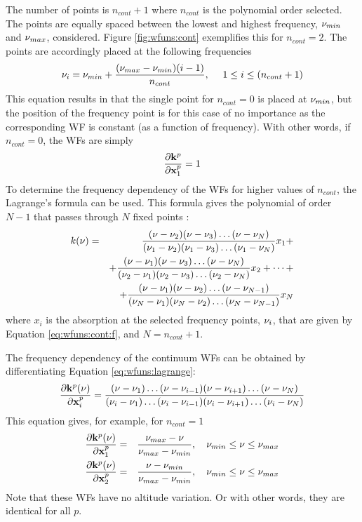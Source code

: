  
 The number of points is $n_{cont}+1$ where $n_{cont}$ is the
 polynomial order selected.  The points are equally spaced between the
 lowest and highest frequency, $\nu_{min}$ and $\nu_{max}$, considered.
 Figure \ref{fig:wfuns:cont} exemplifies this for $n_{cont}=2$.  The
 points are accordingly placed at the following frequencies
 \begin{equation}
   \nu_i = \nu_{min} + \frac{(\nu_{max}-\nu_{min})(i-1)}{n_{cont}}, \
          \quad 1 \leq i \leq (n_{cont}+1)
  \label{eq:wfuns:cont:f}
 \end{equation}
 This equation results in that the single point for $n_{cont}=0$ is
 placed at $\nu_{min}$, but the position of the frequency point is
 for this case of no importance as the corresponding WF is constant
 (as a function of frequency). With other words, 
 if $n_{cont}=0$, the WFs are simply 
 \begin{equation}
   \frac{\partial \mathbf{k}^p}{\partial \mathbf{x}^p_1} = 1
 \end{equation}
 To determine the frequency dependency of the WFs for higher values of
 $n_{cont}$, the Lagrange's formula can be used. This formula gives
 the polynomial of order $N-1$ that passes through $N$ fixed points
 \citep[][Eq. 3.1.1]{press:92}:
 \begin{eqnarray}
   k(\nu) &=& \frac{(\nu-\nu_2)(\nu-\nu_3)\dots(\nu-\nu_N)}
                  {(\nu_1-\nu_2)(\nu_1-\nu_3)\dots(\nu_1-\nu_N)}
           x_1 + \nonumber \\ 
       & & +\frac{(\nu-\nu_1)(\nu-\nu_3)\dots(\nu-\nu_N)}
                 {(\nu_2-\nu_1)(\nu_2-\nu_3)\dots(\nu_2-\nu_N)}
           x_2 + \cdots + \nonumber \\
       & & +\frac{(\nu-\nu_1)(\nu-\nu_2)\dots(\nu-\nu_{N-1})}
                 {(\nu_N-\nu_1)(\nu_N-\nu_2)\dots(\nu_N-\nu_{N-1})} x_N
  \label{eq:wfuns:lagrange}
 \end{eqnarray}
 where $x_i$ is the absorption at the selected frequency points, $\nu_i$,
 that are given by Equation \ref{eq:wfuns:cont:f}, and $N=n_{cont}+1$.
 
 The frequency dependency of the continuum WFs can be obtained by
 differentiating Equation \ref{eq:wfuns:lagrange}:
 \begin{equation}
   \frac{\partial \mathbf{k}^p(\nu)}{\partial \mathbf{x}^p_i} =
   \frac{(\nu-\nu_1)\dots(\nu-\nu_{i-1})(\nu-\nu_{i+1})\dots(\nu-\nu_N)}{(\nu_i-\nu_1)\dots(\nu_i-\nu_{i-1})(\nu_i-\nu_{i+1})\dots(\nu_i-\nu_N)}
 \end{equation}
 This equation gives, for example, for $n_{cont}=1$
 \begin{eqnarray}
   \frac{\partial \mathbf{k}^p(\nu)}{\partial \mathbf{x}^p_1} &=& \frac{\nu_{max}-\nu}
          {\nu_{max}-\nu_{min}}, \quad \nu_{min}\leq \nu \leq \nu_{max} \\
   \frac{\partial \mathbf{k}^p(\nu)}{\partial \mathbf{x}^p_2} &=& \frac{\nu-\nu_{min}}
          {\nu_{max}-\nu_{min}}, \quad \nu_{min}\leq \nu \leq \nu_{max}
 \end{eqnarray}
 Note that these WFs have no altitude variation. Or with
 other words, they are identical for all $p$.


